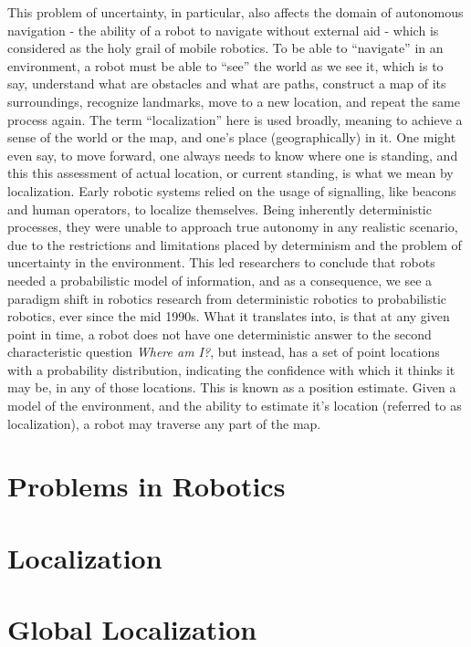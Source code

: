 This problem of uncertainty, in particular, also affects the domain of autonomous navigation - the ability of a robot to navigate without external
aid - which is considered as the holy grail of mobile robotics. To be able to ``navigate'' in an environment, a robot must be able to ``see'' the 
world as we see it, which is to say, understand what are obstacles and what are paths, construct a map of its surroundings, 
recognize landmarks, move to a new location, and repeat the same process again. The term ``localization'' here is used broadly, meaning to 
achieve a sense of the world or
the map, and one's place (geographically) in it. One might even say, to move forward, one always needs to know where one is standing, and this 
this assessment of actual location, or current standing, is what we mean by localization. Early robotic systems relied on the usage 
of signalling, like
beacons and human operators, to localize themselves. Being inherently deterministic processes, they were unable to approach true autonomy in
any realistic scenario,
due to the restrictions and limitations placed by determinism and the problem of uncertainty in the environment. This led researchers to conclude
that robots needed a probabilistic model of information, and as a consequence, we see a paradigm shift in robotics research from deterministic
robotics to probabilistic robotics, ever since the mid 1990s. What it translates into, is that at any given point in time, a robot does not have
one deterministic answer to the second characteristic question \emph{Where am I?}, but instead, has a set of point locations with a probability 
distribution, indicating the confidence with which it thinks it may be, in any of those locations. This is known as a position estimate. Given
a model of the environment, and the ability to estimate it's location (referred to as localization), a robot may traverse any part of the map.

\section{Problems in Robotics}
\label{sec:robo-problems}

\section{Localization}
\label{sec:robo-local}

\section{Global Localization}
\label{sec:robo-global}

